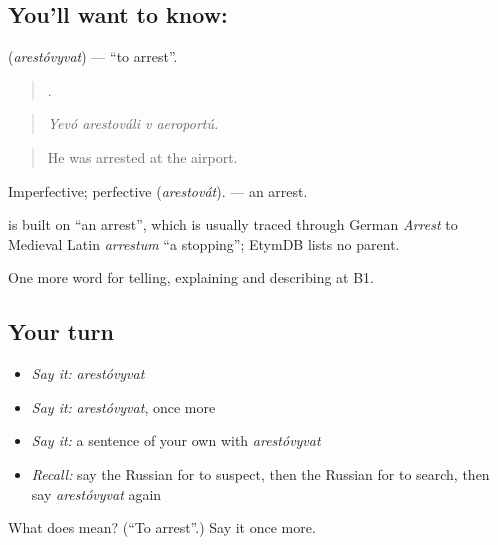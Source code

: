 \subsection*{You'll want to know: }
\textbf{} (\emph{arestóvyvat}) — \textquotedblleft{}to arrest\textquotedblright{}.

\begin{quote}
   .
\end{quote}

\begin{quote}
\emph{Yevó arestováli v aeroportú.}
\end{quote}

\begin{quote}
He was arrested at the airport.
\end{quote}

Imperfective; perfective \emph{} (\emph{arestovát}). \emph{} — an arrest.

\begin{cousinweb}
\emph{} is built on \emph{} \textquotedblleft{}an arrest\textquotedblright{}, which is usually traced through German \emph{Arrest} to Medieval Latin \emph{arrestum} \textquotedblleft{}a stopping\textquotedblright{}; EtymDB lists no parent.
\end{cousinweb}

\begin{grammarlens}[title={What you've built}]
One more word for telling, explaining and describing at B1.
\end{grammarlens}

\subsection*{Your turn}
\begin{itemize}
\raggedright
  \item \emph{Say it:} \emph{arestóvyvat}
  \item \emph{Say it:} \emph{arestóvyvat}, once more
  \item \emph{Say it:} a sentence of your own with \emph{arestóvyvat}
  \item \emph{Recall:} say the Russian for to suspect, then the Russian for to search, then say \emph{arestóvyvat} again
\end{itemize}

\begin{tcolorbox}[breakable,colback=teal!4,colframe=teal!35!black,title={Before you move on}]
What does  mean? (\textquotedblleft{}To arrest\textquotedblright{}.) Say it once more.
\end{tcolorbox}
